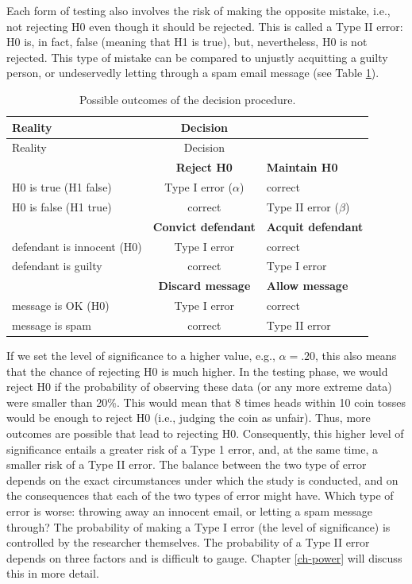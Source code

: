 \documentclass[
]{book}
\begin{document}
Each form of testing also involves the risk of making the opposite mistake, i.e., not rejecting H0 even though it should be rejected. This is called a Type II error: H0 is, in fact, false (meaning that H1 is true), but, nevertheless, H0 is not rejected. This type of mistake can be compared to unjustly acquitting a guilty person, or undeservedly letting through a spam email message (see Table \ref{tab:H0H1outcomes}).

\begin{longtable}[]{@{}lcl@{}}
\caption{\label{tab:H0H1outcomes} Possible outcomes of the decision procedure.}\tabularnewline
\toprule\noalign{}
Reality & Decision & \\
\midrule\noalign{}
\endfirsthead
\toprule\noalign{}
Reality & Decision & \\
\midrule\noalign{}
\endhead
\bottomrule\noalign{}
\endlastfoot
& \textbf{Reject H0} & \textbf{Maintain H0} \\
H0 is true (H1 false) & Type I error (\(\alpha\)) & correct \\
H0 is false (H1 true) & correct & Type II error (\(\beta\)) \\
& \textbf{Convict defendant} & \textbf{Acquit defendant} \\
defendant is innocent (H0) & Type I error & correct \\
defendant is guilty & correct & Type I error \\
& \textbf{Discard message} & \textbf{Allow message} \\
message is OK (H0) & Type I error & correct \\
message is spam & correct & Type II error \\
\end{longtable}

If we set the level of significance to a higher value, e.g., \(\alpha = .20\), this also means that the chance of rejecting H0 is much higher. In the testing phase, we would reject H0 if the probability of observing these data (or any more extreme data) were smaller than 20\%. This would mean that 8 times heads within 10 coin tosses would be enough to reject H0 (i.e., judging the coin as unfair). Thus, more outcomes are possible that lead to rejecting H0. Consequently, this higher level of significance entails a greater risk of a Type 1 error, and, at the same time, a smaller risk of a Type II error. The balance between the two type of error depends on the exact circumstances under which the study is conducted, and on the consequences that each of the two types of error might have. Which type of error is worse: throwing away an innocent email, or letting a spam message through? The probability of making a Type I error (the level of significance) is controlled by the researcher themselves. The probability of a Type II error depends on three factors and is difficult to gauge. Chapter \ref{ch-power} will discuss this in more detail.
\end{document}
